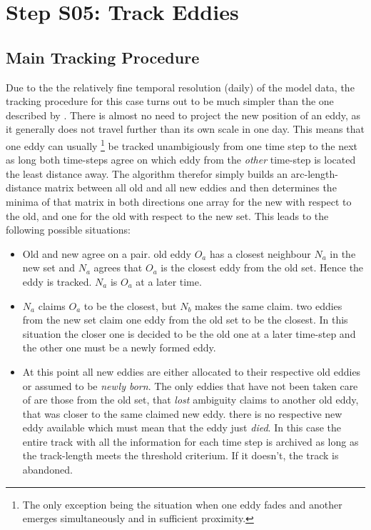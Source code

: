 \section{Step S05: Track Eddies} \label{S:05}
\subsection{Main Tracking Procedure}
Due to the the relatively fine temporal resolution (daily) of the model data,
the tracking procedure for this case turns out to be much simpler than the one described by
\citet{Chelton2007}. There is almost no need to project the new position of an
eddy, as it generally does not travel further than its own scale in one day.
This means that one eddy can usually \footnote{The only exception being the situation when one eddy fades and  another emerges simultaneously and in sufficient proximity.} be tracked unambigiously from one time step to the
next as long both time-steps agree on which eddy from the \textit{other}
time-step is located the least distance away.
The algorithm therefor simply builds an arc-length-distance matrix
between all old and all new eddies and then determines the minima of that
matrix in both directions \ie one array for the new with respect to the old,
and one for the old with respect to the new set. This leads to the following
possible situations:
\begin{itemize}
\item
	Old and new agree on a pair. \Ie old eddy $O_a$ has a closest neighbour $N_a$ in
the new set and $N_a$ agrees that $O_a$ is the closest eddy from the old
set. Hence the eddy is tracked.  $N_a$ is $O_a$ at a later time.
\item
$N_a$ claims $O_a$ to be the closest, but $N_b$ makes the same claim. \Ie two
eddies from the new set claim one eddy from the old set to be the closest.
In this situation the closer one is decided to be the old one at a later
time-step and the other one must be a newly formed eddy.
\item
At this point all new eddies are either allocated to their respective old
eddies or assumed to be \textit{newly born}. The only eddies that have not been
taken care of are those from the old set, that \textit{lost} ambiguity claims to
another old eddy, that was closer to the same claimed new eddy. \Ie there is no
respective new eddy available which must mean that the eddy just \textit{died}.
In this case the entire track with all the information for each time step is
archived as long as the track-length meets the threshold criterium. If it doesn't,
the track is abandoned.
\end{itemize}
